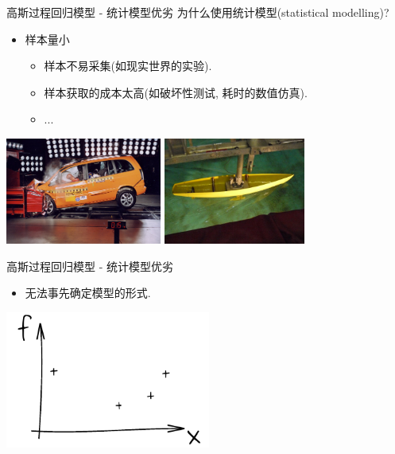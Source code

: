 \begin{frame}[fragile]{高斯过程回归模型 - 统计模型优劣}
    \vspace{2ex}
    为什么使用统计模型(statistical modelling)?
    \vspace{2ex}
    \begin{itemize}
        \item 样本量小
        \begin{itemize}
            \item 样本不易采集(如现实世界的实验).
            \item 样本获取的成本太高(如破坏性测试, 耗时的数值仿真).
            \item ...
        \end{itemize}
    \end{itemize}
    \begin{exampleblock}{}
        \begin{center}
        \includegraphics[height=3.5cm]{./fig/crash-test} 
        \includegraphics[height=3.5cm]{./fig/carene}
        \end{center}
    \end{exampleblock}

\end{frame}

\begin{frame}{高斯过程回归模型 - 统计模型优劣}
    \begin{itemize}
        \item 无法事先确定模型的形式.
    \end{itemize}

    \begin{center}
        \includegraphics[height=4.5cm]{./fig/ink_fX}
    \end{center}
\end{frame}

